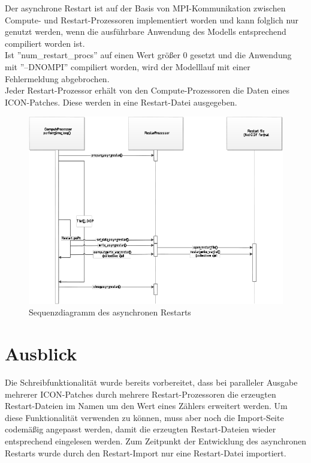 \documentclass[a4paper,10pt,DIV14]{scrartcl}
\begin{document}
Der asynchrone Restart ist auf der Basis von MPI-Kommunikation zwischen Compute- und Restart-Prozessoren implementiert
worden und kann folglich nur genutzt werden, wenn die ausf\"uhrbare Anwendung des Modells entsprechend compiliert worden ist.\\

Ist ''num\_restart\_procs'' auf einen Wert gr\"o\ss er 0 gesetzt und die Anwendung mit ''–DNOMPI'' compiliert worden, wird der Modelllauf
mit einer Fehlermeldung abgebrochen.\\

Jeder Restart-Prozessor erh\"alt von den Compute-Prozessoren die Daten eines ICON-Patches.
Diese werden in eine Restart-Datei ausgegeben. 

\begin{figure}
 \includegraphics[width=\textwidth]{ICONImplementierungAsynchronerRestart-img001.png}
 \caption{Sequenzdiagramm des asynchronen Restarts}
\end{figure} 


\section{Ausblick}

Die Schreibfunktionalit\"at wurde bereits vorbereitet, dass bei paralleler Ausgabe mehrerer ICON-Patches durch mehrere
Restart-Prozessoren die erzeugten Restart-Dateien im Namen um den Wert eines Z\"ahlers erweitert werden.
Um diese Funktionalit\"at verwenden zu k\"onnen, muss aber noch die Import-Seite codem\"a\ss ig angepasst werden, damit die
erzeugten Restart-Dateien wieder entsprechend eingelesen werden.
Zum Zeitpunkt der Entwicklung des asynchronen Restarts wurde durch den Restart-Import nur eine Restart-Datei importiert.\\
\end{document}
